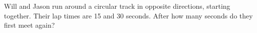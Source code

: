 Will and Jason run around a circular track in opposite directions, starting together. Their lap times are 15 and 30 seconds. After how many seconds do they first meet again?
